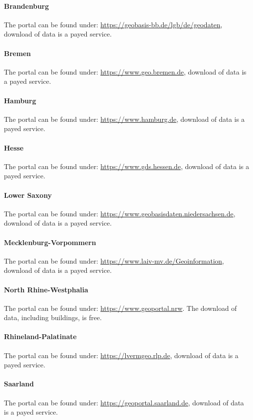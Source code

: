 \documentclass[final, 3p, times, 12pt]{elsarticle} %
\begin{document}
\paragraph{Brandenburg}
The portal can be found under: \url{https://geobasis-bb.de/lgb/de/geodaten}, download of data is a payed service.
\paragraph{Bremen}
The portal can be found under: \url{https://www.geo.bremen.de}, download of data is a payed service.
\paragraph{Hamburg}
The portal can be found under: \url{https://www.hamburg.de}, download of data is a payed service.
\paragraph{Hesse}
The portal can be found under: \url{https://www.gds.hessen.de}, download of data is a payed service.
\paragraph{Lower Saxony}
The portal can be found under: \url{https://www.geobasisdaten.niedersachsen.de}, download of data is a payed service.
\paragraph{Mecklenburg-Vorpommern}
The portal can be found under: \url{https://www.laiv-mv.de/Geoinformation}, download of data is a payed service.
\paragraph{North Rhine-Westphalia}
The portal can be found under:
\url{https://www.geoportal.nrw}. The download of data, including buildings, is free.
\paragraph{Rhineland-Palatinate}
The portal can be found under: \url{https://lvermgeo.rlp.de}, download of data is a payed service.
\paragraph{Saarland}
The portal can be found under: \url{https://geoportal.saarland.de}, download of data is a payed service.
\end{document}
